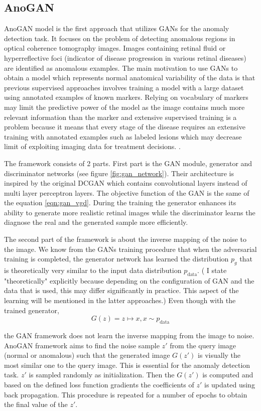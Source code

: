 \subsection{AnoGAN}
\label{sec:anogan}
 AnoGAN model is the first approach that utilizes GANs for the anomaly detection task.
\cite{Schlegl2017UnsupervisedAD} It focuses on the problem of detecting anomalous regions in optical
coherence tomography images. Images containing retinal fluid or hyperreflective foci (indicator of
disease progression in various retinal diseases) are identified as anomalous examples. The main
motivation to use GANs to obtain a model which represents normal anatomical variability of the data
is that previous supervised approaches involves training a model with a large dataset using
annotated examples of known markers. Relying on vocabulary of markers may limit the predictive power
of the model as the image contains much more relevant information than the marker and extensive
supervised training is a problem because it means that every stage of the disease requires an
extensive training with annotated examples such as labeled lesions which may decrease limit of
exploiting imaging data for treatment decisions. \cite{Schlegl2017UnsupervisedAD}.


The framework consists of 2 parts. First part is the GAN module, generator and discriminator
networks (see figure \ref{fig:gan_network}). Their architecture is inspired by the original DCGAN
\cite{Radford2016UnsupervisedRL} which contains convolutional layers instead of multi layer perceptron 
layers. The objective function of the GAN is the same of the equation \ref{eqn:gan_vgd}. 
During the training the generator enhances its ability to generate more realistic
retinal images while the discriminator learns the diagnose the real and the generated sample more
efficiently. 

The second part of the framework is about the inverse mapping of the noise to the image. We know
from the GANs training procedure that when the adversarial training is completed, the generator
network has learned the distribution $p_g$ that is theoretically very similar to the input data
distribution $p_{\text{data}}$. ( I state "theoretically" explicitly because depending on the
configuration of GAN and the data that is used, this may differ significantly in practice. This
aspect of the learning will be mentioned in the latter approaches.) Even though with the trained
generator, 
$$
G(z) = z \mapsto x,x \sim p_{\text{data}}
$$

the GAN framework does not learn the inverse mapping from the image to noise. AnoGAN framework
aims to find the noise sample $z\prime$ from the query image (normal or anomalous) such that the
generated image $G(z\prime)$ is visually the most similar one to the query image. This is essential
for the anomaly detection task. $z\prime$ is sampled randomly as initialization. Then the
$G(z\prime)$ is computed and based on the defined loss function gradients the coefficients of
$z\prime$ is updated using back propagation. This procedure is repeated for a number of epochs to
obtain the final value of the $z\prime$. 

